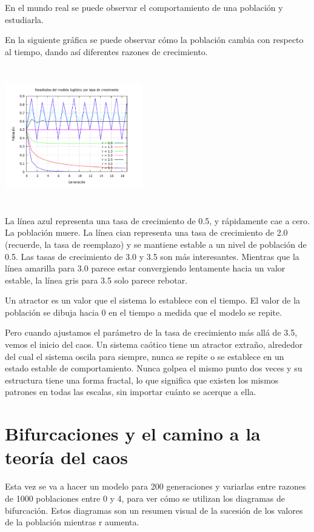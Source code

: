 \documentclass{article}
\begin{document}
En el mundo real se puede observar el comportamiento de una población y estudiarla.

En la siguiente gráfica se puede observar cómo la población cambia con respecto al tiempo, dando así diferentes razones de crecimiento.

\begin{center}
\includegraphics[width=6cm, height=6cm]{Im1.png}
\end{center}

La línea azul representa una tasa de crecimiento de 0.5, y rápidamente cae a cero. La población muere. La línea cian representa una tasa de crecimiento de 2.0 (recuerde, la tasa de reemplazo) y se mantiene estable a un nivel de población de 0.5. Las tasas de crecimiento de 3.0 y 3.5 son más interesantes. Mientras que la línea amarilla para 3.0 parece estar convergiendo lentamente hacia un valor estable, la línea gris para 3.5 solo parece rebotar.

Un atractor es un valor que el sistema lo establece con el tiempo. El valor de la población se dibuja hacia 0 en el tiempo a medida que el modelo se repite.


Pero cuando ajustamos el parámetro de la tasa de crecimiento más allá de 3.5, vemos el inicio del caos. Un sistema caótico tiene un atractor extraño, alrededor del cual el sistema oscila para siempre, nunca se repite o se establece en un estado estable de comportamiento. Nunca golpea el mismo punto dos veces y su estructura tiene una forma fractal, lo que significa que existen los mismos patrones en todas las escalas, sin importar cuánto se acerque a ella.


\section{Bifurcaciones y el camino a la teoría del caos}

Esta vez se va a hacer un modelo para 200 generaciones y variarlas entre razones de 1000 poblaciones entre 0 y 4, para ver cómo se utilizan los diagramas de bifurcación. Estos diagramas son un resumen visual de la sucesión de los valores de la población mientras r aumenta.
\end{document}
